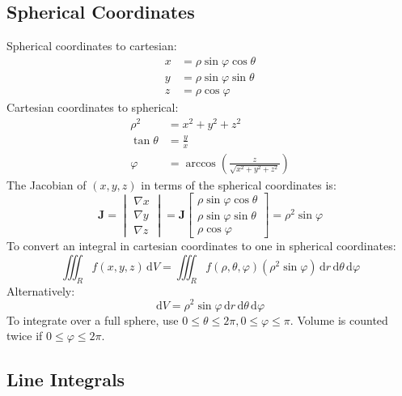 \documentclass{article}
\begin{document}
\subsection{Spherical Coordinates}
Spherical coordinates to cartesian:
\begin{align*}
	x&=\rho \sin\varphi \cos\theta \\
	y&=\rho \sin\varphi \sin\theta \\
	z&=\rho \cos\varphi
\end{align*}
Cartesian coordinates to spherical:
\begin{align*}
	\rho^2&=x^2+y^2+z^2 \\
	\tan\theta&=\frac{y}{x} \\
	\varphi&=\arccos\left(\frac{z}{\sqrt{x^2+y^2+z^2}}\right)
\end{align*}
The Jacobian of $(x,y,z)$ in terms of the spherical coordinates is:
\begin{equation*}
	\mathbf J
	=\begin{vmatrix}
		\nabla x \\
		\nabla y \\
		\nabla z
	\end{vmatrix}
	=\mathbf J \begin{bmatrix}
		\rho \sin\varphi \cos\theta \\
		\rho \sin\varphi \sin\theta \\
		\rho \cos\varphi
	\end{bmatrix}
	=\rho^2\sin\varphi
\end{equation*}
To convert an integral in cartesian coordinates to one in spherical coordinates:
\begin{equation*}
    \iiint_R f(x,y,z) \,\mathrm{d}V
	=\iiint_R f(\rho, \theta, \varphi)(\rho^2\sin\varphi) \,\mathrm{d}r \,\mathrm{d}\theta \,\mathrm{d}\varphi
\end{equation*}
Alternatively:
\begin{equation*}
    \mathrm{d}V=\rho^2\sin\varphi\,\mathrm{d}r\,\mathrm{d}\theta\,\mathrm{d}\varphi
\end{equation*}
To integrate over a full sphere, use $0\leq \theta\leq 2\pi, 0\leq \varphi\leq \pi$. Volume is counted twice if $0\leq\varphi\leq 2\pi$.

\subsection{Line Integrals}
\end{document}
